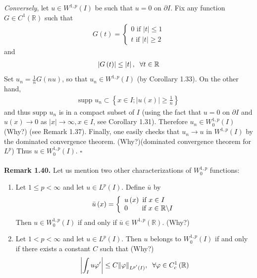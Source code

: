 \documentclass[a4paper,oneside]{article}
\numberwithin{equation}{section}
\begin{document}
\textit{Conversely}, let $u\in W^{1,p}\left(I\right)$ be such that $u=0$ on $\partial I$. Fix any function $G\in C^1\left(\mathbb{R}\right)$ such that
\begin{align}
G\left( t \right) = \left\{ {\begin{array}{*{20}{c}}
{0\mbox{ if } \left| t \right| \le 1}\\
{t\mbox{ if } \left| t \right| \ge 2}
\end{array}} \right.
\end{align}
and
\begin{align}
\left| {G\left( t \right)} \right| \le \left| t \right|,\hspace{0.2cm}\forall t \in \mathbb{R}
\end{align}
Set ${u_n} = \frac{1}{n}G\left( {nu} \right)$, so that $u_n\in W^{1,p}\left(I\right)$ (by Corollary 1.33). On the other hand,
\begin{align}
\mbox{supp }{u_n} \subset \left\{ {x \in I;\left| {u\left( x \right)} \right| \ge \frac{1}{n}} \right\}
\end{align}
and thus $\mbox{supp }u_n$ is in a compact subset of $I$ (using the fact that $u=0$ on $\partial I$ and $u\left(x\right)\to 0$ as $\left| x \right| \to \infty ,x \in I$, see Corollary 1.31). Therefore $u_n\in W_0^{1,p}\left(I\right)$ (Why?) (see Remark 1.37). Finally, one easily checks that $u_n\to u$ in $W^{1,p}\left(I\right)$ by the dominated convergence theorem.  (Why?)(dominated convergence theorem for $L^p$) Thus $u\in W_0^{1,p}\left(I\right)$. \hfill $\square$\\
\\
\textbf{Remark 1.40.} Let us mention two other characterizations of $W_0^{1,p}$ functions:
\begin{enumerate}
\item Let $1\le p<\infty$ and let $u\in L^p\left(I\right)$. Define $\bar{u}$ by
\begin{align}
\bar u\left( x \right) = \left\{ {\begin{array}{*{20}{l}}
{u\left( x \right)\mbox{ if } x \in I}\\
{0\hspace{0.6cm}\mbox{ if } x \in \mathbb{R} \backslash I}
\end{array}} \right.
\end{align}
Then $u\in W_0^{1,p}\left(I\right)$ if and only if $\bar u \in W^{1,p}\left(\mathbb{R}\right)$. (Why?)
\item Let $1<p<\infty$ and let $u\in L^p\left(I\right)$. Then $u$ belongs to $W_0^{1,p}\left(I\right)$ if and only if there exists a constant $C$ such that (Why?)
\begin{align}
\left| {\int_I {u\varphi '} } \right| \le C{\left\| \varphi  \right\|_{{L^{p'}}\left( I \right)}},\hspace{0.2cm}\forall \varphi  \in C_c^1\left( \mathbb{R} \right)
\end{align}
\end{enumerate}
\end{document}
